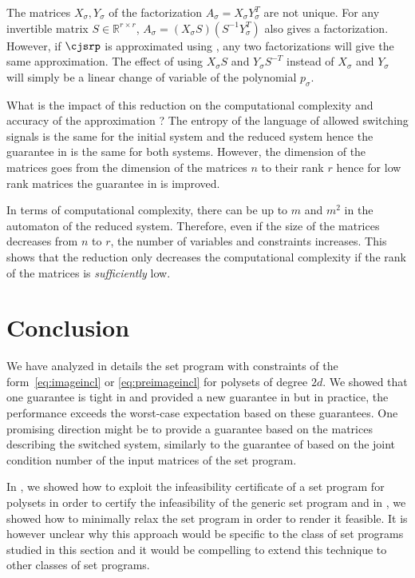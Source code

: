 \documentclass[11pt,twoside,a4paper,openright]{uclouvain-thesis}
\begin{document}
\begin{myrem}
  The matrices $X_\sigma, Y_\sigma$ of the factorization $A_\sigma = X_\sigma Y_\sigma^T$ are not unique.
  For any invertible matrix $S \in \mathbb{R}^{r \times r}$, $A_\sigma = (X_\sigma S)(S^{-1}Y_\sigma^T)$ also gives a factorization.
  However, if $\cjsrp$ is approximated using ,
  any two factorizations will give the same approximation.
  The effect of using $X_\sigma S$ and $Y_\sigma S^{-T}$ instead of $X_\sigma$ and $Y_\sigma$ will simply be a linear change of variable of the polynomial $p_\sigma$. %

\end{myrem}

What is the impact of this reduction on the computational complexity and accuracy of the approximation ?
The entropy of the language of allowed switching signals is the same for the initial system and the reduced system hence the guarantee in  is the same for both systems.
However, the dimension of the matrices goes from the dimension of the matrices $n$ to their rank $r$
hence for low rank matrices the guarantee in  is improved.

In terms of computational complexity, there can be up to $m$ \nodes{} and $m^2$ \arcs{} in the automaton of the reduced system.
Therefore, even if the size of the matrices decreases from $n$ to $r$, the number of variables and constraints increases.
This shows that the reduction only decreases the computational complexity if the rank of the matrices is \emph{sufficiently} low.





\section{Conclusion}

We have analyzed in details the set program with
constraints of the form~\eqref{eq:imageincl} or \eqref{eq:preimageincl}
for polysets of degree $2d$.
We showed that one guarantee is tight in  and
provided a new guarantee in  but
in practice, the performance exceeds the worst-case expectation based on these guarantees.
One promising direction might be to provide a guarantee based on the matrices describing the switched system,
similarly to the guarantee of  based on the joint condition number of the input matrices of the set program.

In , we showed how to exploit the
infeasibility certificate of a set program for polysets in order to certify the
infeasibility of the generic set program and in ,
we showed how to minimally relax the set program in order to render it feasible.
It is however unclear why this approach would be specific to the class of set
programs studied in this section and it would be compelling to extend this
technique to other classes of set programs.
\end{document}
